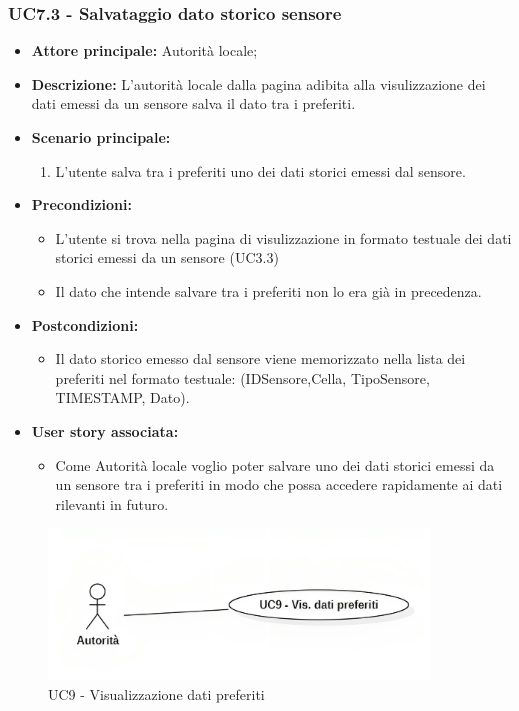 \documentclass{article}
\begin{document}
\subsubsection{UC7.3 - Salvataggio dato storico sensore}
\begin{itemize}
    \item \textbf{Attore principale:} Autorità locale;
    \item \textbf{Descrizione:} L’autorità locale dalla pagina adibita alla visulizzazione dei dati emessi da un sensore salva il dato tra i preferiti.
    \item \textbf{Scenario principale:}
          \begin{enumerate}
              \item L'utente salva tra i preferiti uno dei dati storici emessi dal sensore.
          \end{enumerate}
    \item \textbf{Precondizioni:}
          \begin{itemize}
              \item  L'utente si trova nella pagina di visulizzazione in formato testuale dei dati storici emessi da un sensore (UC3.3)
              \item  Il dato che intende salvare tra i preferiti non lo era già in precedenza.
          \end{itemize}
    \item \textbf{Postcondizioni:}
          \begin{itemize}
              \item  Il dato storico emesso dal sensore viene memorizzato nella lista dei preferiti nel formato testuale: (IDSensore,Cella, TipoSensore,
                    TIMESTAMP, Dato).
          \end{itemize}
    \item \textbf{User story associata:}
          \begin{itemize}
              \item Come Autorità locale voglio poter salvare uno dei dati storici emessi da un sensore tra i preferiti in modo che possa accedere rapidamente ai dati rilevanti in futuro.
          \end{itemize}
\end{itemize}


\begin{figure}[H]
    \centering
    \includegraphics[width=0.9\textwidth]{Images/uc9.png}
    \caption{UC9 - Visualizzazione dati preferiti}
    \label{fig:UC9}
\end{figure}
\end{document}
